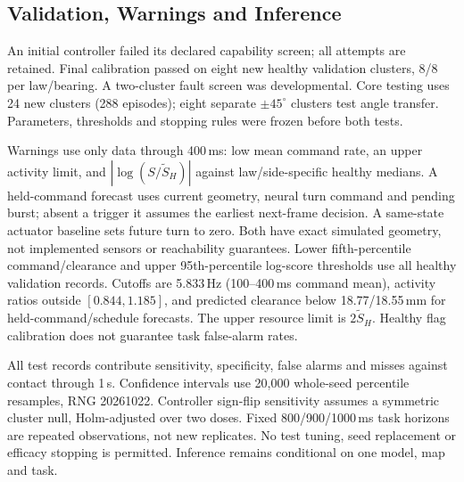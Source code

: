 \subsection{Validation, Warnings and Inference}
An initial controller failed its declared capability screen; all attempts are retained. Final calibration passed on eight new healthy validation clusters, 8/8 per law/bearing. A two-cluster fault screen was developmental. Core testing uses 24 new clusters (288 episodes); eight separate $\pm45^\circ$ clusters test angle transfer. Parameters, thresholds and stopping rules were frozen before both tests.

Warnings use only data through 400\,ms: low mean command rate, an upper activity limit, and $|\log(S/\tilde S_H)|$ against law/side-specific healthy medians. A held-command forecast uses current geometry, neural turn command and pending burst; absent a trigger it assumes the earliest next-frame decision. A same-state actuator baseline sets future turn to zero. Both have exact simulated geometry, not implemented sensors or reachability guarantees. Lower fifth-percentile command/clearance and upper 95th-percentile log-score thresholds use all healthy validation records. Cutoffs are 5.833\,Hz (100--400\,ms command mean), activity ratios outside $[0.844,1.185]$, and predicted clearance below 18.77/18.55\,mm for held-command/schedule forecasts. The upper resource limit is $2\tilde S_H$. Healthy flag calibration does not guarantee task false-alarm rates.

All test records contribute sensitivity, specificity, false alarms and misses against contact through 1\,s. Confidence intervals use 20,000 whole-seed percentile resamples, RNG 20261022. Controller sign-flip sensitivity assumes a symmetric cluster null, Holm-adjusted over two doses. Fixed 800/900/1000\,ms task horizons are repeated observations, not new replicates. No test tuning, seed replacement or efficacy stopping is permitted. Inference remains conditional on one model, map and task.

